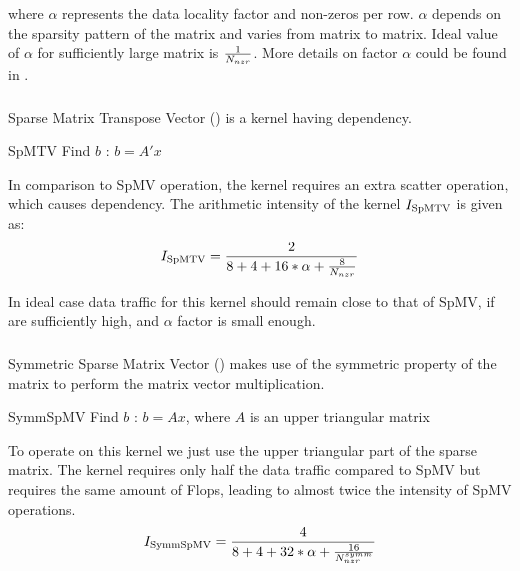 where $\alpha$ represents the data locality factor and \NNZR non-zeros per row. $\alpha$ depends on the sparsity pattern of the matrix and varies from matrix to matrix. Ideal value of $\alpha$ for sufficiently large matrix is $\frac{1}{N_{nzr}}$. More details on factor $\alpha$ could be found in \cite{Moritz_sell}.

\subsubsection{\SpMTV}
Sparse Matrix Transpose Vector (\SpMTV) is a kernel having \DTWO dependency.
\begin{algorithm}[H]
	\caption{SpMTV Find $b$ : $b=A'x$} 
	\label{alg:SpMTV}
	\begin{algorithmic}[1]
		\ENDFOR
		\ENDFOR
	\end{algorithmic}
\end{algorithm}
In comparison to SpMV operation, the kernel requires an extra scatter operation, which causes dependency. The arithmetic intensity of the kernel $I_\mathrm{SpMTV}$ is given as:
\begin{equation}
\label{eq:SpMTV_intensity}
I_\mathrm{\SpMTV} = \frac{2}{8+4+16*\alpha+\frac{8}{\NNZRmath}} \\
\end{equation}

In ideal case data traffic for this kernel should remain close to that of SpMV, if \NNZR are sufficiently high, and $\alpha$ factor is small enough.

\subsubsection{\SymmSpmv}
Symmetric Sparse Matrix Vector (\SymmSpmv) makes use of the symmetric property of the matrix to perform the matrix  vector multiplication.
\begin{algorithm}[H]
	\caption{SymmSpMV Find $b$ : $b=Ax$, where $A$ is an upper triangular matrix} 
	\label{alg:SymmSpMV}
	\begin{algorithmic}[1]
		\ENDFOR
		\ENDFOR
	\end{algorithmic}
\end{algorithm}
To operate on this kernel we just use the upper triangular part of the sparse matrix. The kernel requires only half the data traffic compared to SpMV but requires the same amount of Flops, leading to almost twice the intensity of SpMV operations.
\begin{equation}
\label{eq:SymmSpMV_intensity}
I_\mathrm{\SymmSpmv} = \frac{4}{8+4+32*\alpha+\frac{16}{\NNZRmathSYMM}} \\
\end{equation}

